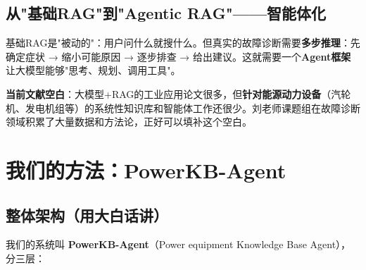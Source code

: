 \documentclass[a4paper, 11pt]{ctexart}
\begin{document}
\subsection{从"基础RAG"到"Agentic RAG"——智能体化}

基础RAG是"被动的"：用户问什么就搜什么。但真实的故障诊断需要\textbf{多步推理}：先确定症状 → 缩小可能原因 → 逐步排查 → 给出建议。这就需要一个\textbf{Agent框架}让大模型能够"思考、规划、调用工具"。

\begin{tcolorbox}[colback=bglight, colframe=tsinghua!30, arc=2mm]
\textbf{当前文献空白}：大模型+RAG的工业应用论文很多，但\textbf{针对能源动力设备}（汽轮机、发电机组等）的系统性知识库和智能体工作还很少。刘老师课题组在故障诊断领域积累了大量数据和方法论，正好可以填补这个空白。
\end{tcolorbox}


\section{我们的方法：PowerKB-Agent}

\subsection{整体架构（用大白话讲）}

我们的系统叫 \textbf{PowerKB-Agent}（Power equipment Knowledge Base Agent），分三层：
\end{document}
